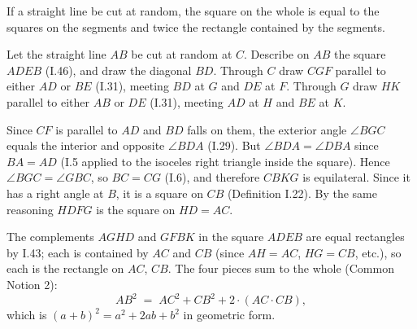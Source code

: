 \documentclass{rrxiv}
\begin{document}
\begin{claim}
\label{prop:II.4}
If a straight line be cut at random, the square on the whole is equal
to the squares on the segments and twice the rectangle contained by
the segments.
\end{claim}
\begin{evidence}[Proof of II.4]
\label{ev:II.4}

Let the straight line $AB$ be cut at random at $C$.  Describe on $AB$
the square $ADEB$ (I.46), and draw the diagonal $BD$.  Through $C$
draw $CGF$ parallel to either $AD$ or $BE$ (I.31), meeting $BD$ at
$G$ and $DE$ at $F$.  Through $G$ draw $HK$ parallel to either $AB$
or $DE$ (I.31), meeting $AD$ at $H$ and $BE$ at $K$.

Since $CF$ is parallel to $AD$ and $BD$ falls on them, the exterior
angle $\angle BGC$ equals the interior and opposite $\angle BDA$
(I.29).  But $\angle BDA = \angle DBA$ since $BA = AD$ (I.5 applied
to the isoceles right triangle inside the square).  Hence
$\angle BGC = \angle GBC$, so $BC = CG$ (I.6), and therefore $CBKG$
is equilateral.  Since it has a right angle at $B$, it is a square
on $CB$ (Definition I.22).  By the same reasoning $HDFG$ is the
square on $HD = AC$.

The complements $AGHD$ and $GFBK$ in the square $ADEB$ are equal
rectangles by I.43; each is contained by $AC$ and $CB$ (since
$AH = AC$, $HG = CB$, etc.), so each is the rectangle on $AC$, $CB$.
The four pieces sum to the whole (Common Notion 2):
\[
    AB^2 \;=\; AC^2 + CB^2 + 2\cdot(AC\cdot CB),
\]
which is $(a+b)^2 = a^2 + 2ab + b^2$ in geometric form.
\end{evidence}
\end{document}
